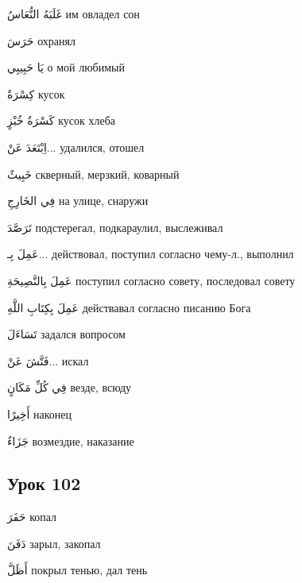 \documentclass[a5paper]{article}
\newcommand\textstyleDropCaps[1]{#1}
\newcommand\textstyleCaptioncharacters[1]{#1}
\begin{document}
\textstyleCaptioncharacters{غَلَبَهُ النُّعَاسُ }\textstyleDropCaps{им овла­дел сон‎}

\textstyleCaptioncharacters{حَرَسَ }\textstyleDropCaps{охранял‎}

\textstyleCaptioncharacters{يَا حَبِيبِي }\textstyleDropCaps{о мой люби­мый‎}

\textstyleCaptioncharacters{كِسْرَةٌ }\textstyleDropCaps{кусок‎}

\textstyleCaptioncharacters{كَسْرَةُ خُبْزٍ }\textstyleDropCaps{кусок хлеба‎}

\textstyleCaptioncharacters{اِبْتَعَدَ عَنْ... }\textstyleDropCaps{удалился, отошел‎}

\textstyleCaptioncharacters{خَبِيثٌ }\textstyleDropCaps{скверный, мерз­кий, коварный‎}

\textstyleCaptioncharacters{فِي الخَارِجِ }\textstyleDropCaps{на улице, снаружи‎}

\textstyleCaptioncharacters{تَرَصَّدَ }\textstyleDropCaps{подстерегал, подкар­аулил, выслеживал‎}

\textstyleCaptioncharacters{عَمِلَ بِـ... }\textstyleDropCaps{действовал, по­ступил согласно чему-л., выполнил‎}

\textstyleCaptioncharacters{عَمِلَ بِالنَّصِيحَةِ }\textstyleDropCaps{посту­пил согласно совету, последовал совету‎}

\textstyleCaptioncharacters{عَمِلَ بِكِتَابِ اللَّهِ }\textstyleDropCaps{дей­ствавал согласно писанию Бога‎}

\textstyleCaptioncharacters{تَسَاءَلَ }\textstyleDropCaps{задался вопросом‎}

\textstyleCaptioncharacters{فَتَّشَ عَنْ... }\textstyleDropCaps{искал‎}

\textstyleCaptioncharacters{فِي كُلِّ مَكَانٍ }\textstyleDropCaps{везде, всюду‎}

\textstyleCaptioncharacters{أَخِيرًا }\textstyleDropCaps{наконец‎}

\textstyleCaptioncharacters{جَزَاءٌ }\textstyleDropCaps{возмездие, наказа­ние‎}

\subsection[Урок 102‎]{\textstyleDropCaps{Урок 102‎}}
\textstyleCaptioncharacters{حَفَرَ }\textstyleDropCaps{копал‎}

\textstyleCaptioncharacters{دَفَنَ }\textstyleDropCaps{зарыл, закопал‎}

\textstyleCaptioncharacters{أَظَلَّ }\textstyleDropCaps{покрыл тенью, дал тень‎}
\end{document}
